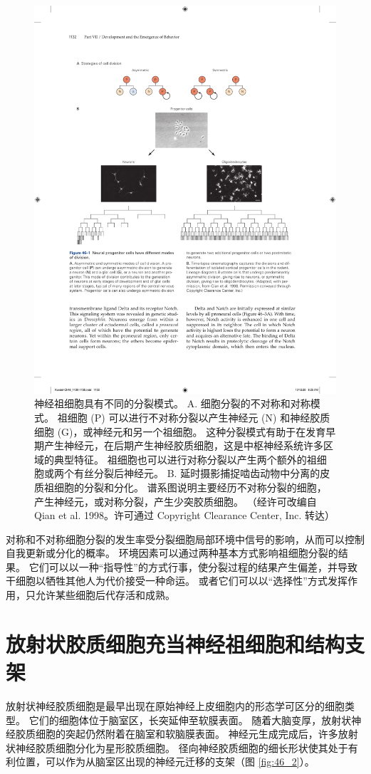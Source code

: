 \begin{figure}[htbp]
	\centering
	\includegraphics[width=0.9\linewidth]{chap46/fig_46_1}
	\caption{神经祖细胞具有不同的分裂模式。 A. 细胞分裂的不对称和对称模式。 祖细胞 (P) 可以进行不对称分裂以产生神经元 (N) 和神经胶质细胞 (G)，或神经元和另一个祖细胞。 这种分裂模式有助于在发育早期产生神经元，在后期产生神经胶质细胞，这是中枢神经系统许多区域的典型特征。 祖细胞也可以进行对称分裂以产生两个额外的祖细胞或两个有丝分裂后神经元。 B. 延时摄影捕捉啮齿动物中分离的皮质祖细胞的分裂和分化。 谱系图说明主要经历不对称分裂的细胞，产生神经元，或对称分裂，产生少突胶质细胞。 （经许可改编自 Qian et al. 1998。许可通过 Copyright Clearance Center, Inc. 转达）}
	\label{fig:46_1}
\end{figure}

对称和不对称细胞分裂的发生率受分裂细胞局部环境中信号的影响，从而可以控制自我更新或分化的概率。 环境因素可以通过两种基本方式影响祖细胞分裂的结果。 它们可以以一种“指导性”的方式行事，使分裂过程的结果产生偏差，并导致干细胞以牺牲其他人为代价接受一种命运。 或者它们可以以“选择性”方式发挥作用，只允许某些细胞后代存活和成熟。

\section{放射状胶质细胞充当神经祖细胞和结构支架}
放射状神经胶质细胞是最早出现在原始神经上皮细胞内的形态学可区分的细胞类型。 它们的细胞体位于脑室区，长突延伸至软膜表面。 随着大脑变厚，放射状神经胶质细胞的突起仍然附着在脑室和软脑膜表面。 神经元生成完成后，许多放射状神经胶质细胞分化为星形胶质细胞。 
径向神经胶质细胞的细长形状使其处于有利位置，可以作为从脑室区出现的神经元迁移的支架（图 \ref{fig:46_2}）。

